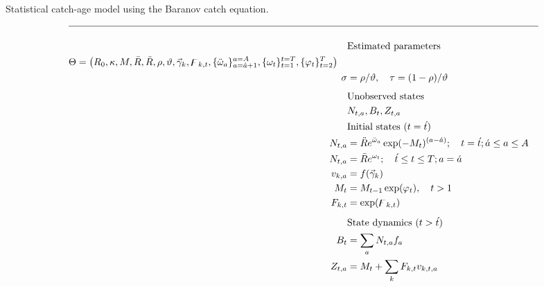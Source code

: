 \begin{table}[!tpb]
  \centering
\caption{Statistical catch-age model using the Baranov catch
equation.}\label{Table4}
\tableEq
    \begin{align}
        \hline \nonumber \\
        &\mbox{Estimated parameters} \nonumber\\
        \begin{split}
        \Theta&= 
        		\left(R_0,\kappa,M,\bar{R},\ddot{R},\rho,\vartheta,
		\vec{\gamma}_{k}
				,\digamma_{k,t}, %
		 \{\ddot{\omega}_a\}_{a=\acute{a}+1}^{a=A},
		 \{\omega_t\}_{t=1}^{t=T},
        		\{\varphi_t \}_{t=2}^T\right)
	\end{split} \label{T4.1}\\
        \sigma&=\rho /\vartheta, \quad
        \tau=(1-\rho)/\vartheta\label{T4.2}\\[1ex]
        &\mbox{Unobserved states} \nonumber\\
        &N_{t,a},B_t,Z_{t,a}	\label{T4.3}\\
        &\mbox{Initial states ($t=\acute{t}$)} \nonumber\\
        N_{t,a}&=\ddot{R}e^{\ddot{\omega}_{a}} \exp(-M_t)^{(a-\acute{a})};
        	\quad t=\acute{t};  \acute{a}\leq a\leq A \label{T4.4}\\
        N_{t,a}&=\bar{R}e^{\omega_{t}} ;\quad \acute{t}\leq t\leq T;  
        	a=\acute{a} \label{T4.5}\\
        v_{k,a}&=f(\vec{\gamma}_k) \label{T4.6}\\
        M_t &= M_{t-1} \exp(\varphi_t), \quad t>1 \label{T4.6b}\\
        F_{k,t}&= \exp(\digamma_{k,t}) \label{T4.7}\\[1ex]
        &\mbox{State dynamics ($t>\acute{t}$)} \nonumber\\
        B_t&=\sum_a N_{t,a}f_a \label{T4.8}\\
        Z_{t,a}&=M_t+\sum_k F_{k,t} v_{k,t,a}\label{T4.9}\\

\end{align}
\end{table}
